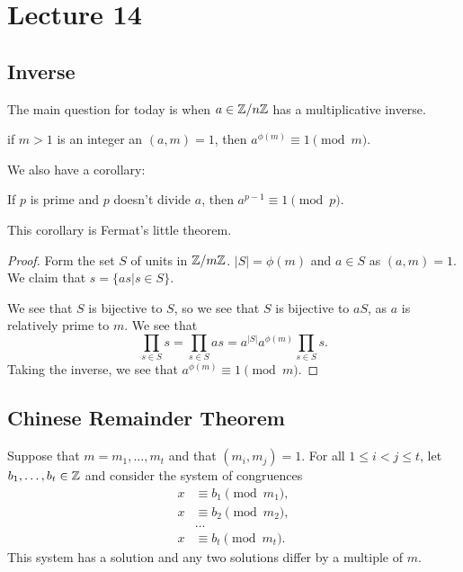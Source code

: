 \documentclass{article}
\begin{document}
\section{Lecture 14}
\subsection{Inverse}
The main question for today is when $a \in \mathbb Z / n \mathbb Z$ has a multiplicative inverse. 

\begin{theorem} 
	if $m > 1$ is an integer an $(a, m) = 1$, then $a^{\phi(m)} \equiv 1 \pmod m$. 
\end{theorem}

We also have a corollary: 
\begin{corollary}
	If $p$ is prime and $p$ doesn't divide $a$, then $a^{p-1} \equiv 1 \pmod p$. 
\end{corollary}

This corollary is Fermat's little theorem.

\begin{proof}
	Form the set $S$ of units in $\mathbb Z / m \mathbb Z$. $|S| = \phi(m)$ and $a \in S$ as $(a, m) = 1$. We claim that $s = \{as | s \in S\}$. 

	We see that $S$ is bijective to $S$, so we see that $S$ is bijective to $aS$, as $a$ is relatively prime to $m$. We see that \[\prod_{s \in S} s = \prod_{s \in S} as = a^{|S|} a^{\phi(m)} \prod_{s \in S} s.\] Taking the inverse, we see that $a^{\phi(m)} \equiv 1 \pmod m$. 
\end{proof}

\subsection{Chinese Remainder Theorem}
\begin{theorem}
	Suppose that $m = m_1, \ldots, m_t$ and that $(m_i, m_j) = 1$. For all $1 \leq i < j \leq t$, let $b_1, \ldots, b_t \in \mathbb Z$ and consider the system of congruences \begin{align*}x &\equiv b_1 \pmod{m_1},\\ x &\equiv b_2 \pmod{m_2}, \\ &\ldots \\ x &\equiv b_t \pmod{m_t}.\end{align*} 
	This system has a solution and any two solutions differ by a multiple of $m$.  
\end{theorem}
\end{document}
